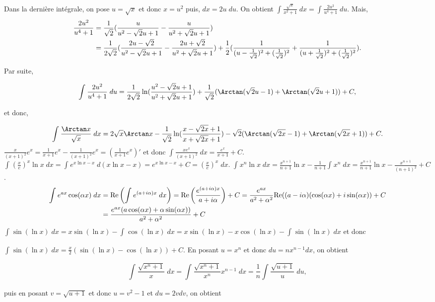 {{Dans la dernière intégrale, on pose $u=\sqrt{x}$ et donc $x=u^2$ puis, $dx=2u\;du$. On obtient $\int_{}^{}\frac{\sqrt{x}}{x^2+1}\;dx=\int_{}^{}\frac{2u^2}{u^4+1}\;du$. Mais,
\begin{align*}\ensuremath
\frac{2u^2}{u^4+1}&=\frac{1}{\sqrt{2}}(\frac{u}{u^2-\sqrt{2}u+1}-\frac{u}{u^2+\sqrt{2}u+1})\\
 &=\frac{1}{2\sqrt{2}}(\frac{2u-\sqrt{2}}{u^2-\sqrt{2}u+1}-\frac{2u+\sqrt{2}}{u^2+\sqrt{2}u+1})+\frac{1}{2}(\frac{1}{(u-\frac{1}{\sqrt{2}})^2+(\frac{1}{\sqrt{2}})^2}+\frac{1}{(u+\frac{1}{\sqrt{2}})^2+(\frac{1}{\sqrt{2}})^2}).
\end{align*}

Par suite,

$$\int_{}^{}\frac{2u^2}{u^4+1}\;du=\frac{1}{2\sqrt{2}}\ln(\frac{u^2-\sqrt{2}u+1}{u^2+\sqrt{2}u+1})+\frac{1}{\sqrt{2}}
(\Arctan(\sqrt{2}u-1)+\Arctan(\sqrt{2}u+1))+C,$$

et donc,

$$\int_{}^{}\frac{\Arctan x}{\sqrt{x}}\;dx=2\sqrt{x}\Arctan x-\frac{1}{\sqrt{2}}\ln(\frac{x-\sqrt{2x}+1}{x+\sqrt{2x}+1})-\sqrt{2}(\Arctan(\sqrt{2x}-1)+\Arctan(\sqrt{2x}+1))+C.$$
$\frac{x}{(x+1)^2}e^x=\frac{1}{x+1}e^x-\frac{1}{(x+1)^2}e^x=\left(\frac{1}{x+1}e^x\right)'$ et donc 
$\int_{}^{}\frac{xe^x}{(x+1)^2}\;dx=\frac{e^x}{x+1}+C$.
$\int_{}^{}\left(\frac{x}{e}\right)^x\ln x\;dx=\int_{}^{}e^{x\ln x-x}\;d(x\ln x-x)=e^{x\ln x-x}+C=\left(\frac{x}{e}\right)^x\;dx$.
$\int_{}^{}x^n\ln x\;dx=\frac{x^{n+1}}{n+1}\ln x-\frac{1}{n+1}\int_{}^{}x^n\;dx=\frac{x^{n+1}}{n+1}\ln x-\frac{x^{n+1}}{(n+1)^2}+C$.
\begin{align*}\ensuremath
\int_{}^{}e^{ax}\cos(\alpha x)\;dx&=\mbox{Re}\left(\int_{}^{}e^{(a+i\alpha)x}\;dx\right)=\mbox{Re}\left(\frac{e^{(a+i\alpha)x}}{a+i\alpha}\right)+C
=\frac{e^{ax}}{a^2+\alpha^2}\mbox{Re}((a-i\alpha)(\cos(\alpha x)+i\sin(\alpha x))+C\\
 &=\frac{e^{ax}(a\cos(\alpha x)+\alpha\sin(\alpha x))}{a^2+\alpha^2}+C
\end{align*}
$\int_{}^{}\sin(\ln x)\;dx=x\sin(\ln x)-\int_{}^{}\cos(\ln x)\;dx=x\sin(\ln x)-x\cos(\ln x)-\int_{}^{}\sin(\ln x)\;dx$ et donc 

$\int_{}^{}\sin(\ln x)\;dx=\frac{x}{2}(\sin(\ln x)-\cos(\ln x))+C$.
En posant $u=x^n$ et donc $du=nx^{n-1}dx$, on obtient

$$\int_{}^{}\frac{\sqrt{x^n+1}}{x}\;dx=\int_{}^{}\frac{\sqrt{x^n+1}}{x^n}x^{n-1}\;dx=\frac{1}{n}\int_{}^{}\frac{\sqrt{u+1}}{u}\;du,$$

puis en posant $v=\sqrt{u+1}$ et donc $u=v^2-1$ et $du=2vdv$, on obtient

}}
